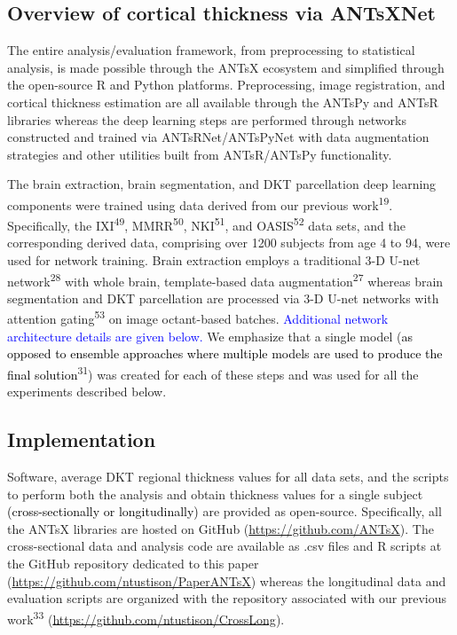 \documentclass[12pt,]{article}
\begin{document}
\hypertarget{overview-of-cortical-thickness-via-antsxnet}{%
\subsection*{Overview of cortical thickness via
ANTsXNet}\label{overview-of-cortical-thickness-via-antsxnet}}

The entire analysis/evaluation framework, from preprocessing to
statistical analysis, is made possible through the ANTsX ecosystem and
simplified through the open-source R and Python platforms.
Preprocessing, image registration, and cortical thickness estimation are
all available through the ANTsPy and ANTsR libraries whereas the deep
learning steps are performed through networks constructed and trained
via ANTsRNet/ANTsPyNet with data augmentation strategies and other
utilities built from ANTsR/ANTsPy functionality.

The brain extraction, brain segmentation, and DKT parcellation deep
learning components were trained using data derived from our previous
work\textsuperscript{19}. Specifically, the IXI\textsuperscript{49},
MMRR\textsuperscript{50}, NKI\textsuperscript{51}, and
OASIS\textsuperscript{52} data sets, and the corresponding derived data,
comprising over 1200 subjects from age 4 to 94, were used for network
training. Brain extraction employs a traditional 3-D U-net
network\textsuperscript{28} with whole brain, template-based data
augmentation\textsuperscript{27} whereas brain segmentation and DKT
parcellation are processed via 3-D U-net networks with attention
gating\textsuperscript{53} on image octant-based batches.
\textcolor{blue}{Additional network architecture details are given below.}
We emphasize that a single model
(\textcolor{black}{as opposed to ensemble
approaches where multiple models are used to produce the final solution}\textsuperscript{31})
was created for each of these steps and was used for all the experiments
described below.

\hypertarget{implementation}{%
\subsection*{Implementation}\label{implementation}}

Software, average DKT regional thickness values for all data sets, and
the scripts to perform both the analysis and obtain thickness values for
a single subject
\textcolor{black}{(cross-sectionally or longitudinally)} are provided as
open-source. Specifically, all the ANTsX libraries are hosted on GitHub
(\url{https://github.com/ANTsX}). The cross-sectional data and analysis
code are available as .csv files and R scripts at the GitHub repository
dedicated to this paper (\url{https://github.com/ntustison/PaperANTsX})
whereas the longitudinal data and evaluation scripts are organized with
the repository associated with our previous work\textsuperscript{33}
(\url{https://github.com/ntustison/CrossLong}).
\end{document}
